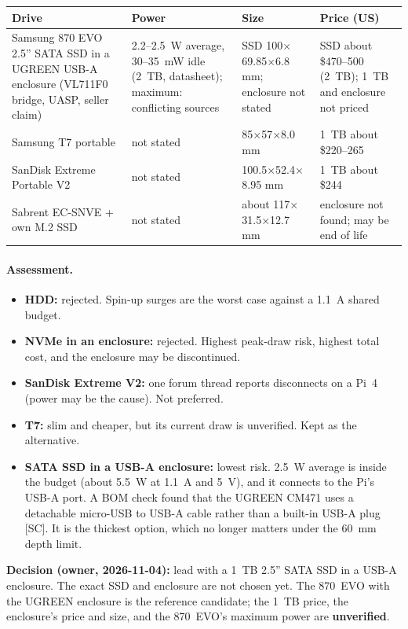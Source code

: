\documentclass[11pt,a4paper]{article}
\begin{document}
\begin{longtable}{p{4.2cm} p{3.4cm} p{3.6cm} p{3.2cm}}
\toprule
\textbf{Drive} & \textbf{Power} & \textbf{Size} & \textbf{Price (US)} \\
\midrule\endhead
Samsung 870 EVO 2.5'' SATA SSD in a UGREEN USB-A enclosure (VL711F0 bridge, UASP, seller claim) & 2.2--2.5~W average, 30--35~mW idle (2~TB, datasheet); maximum: conflicting sources & SSD 100$\times$69.85$\times$6.8 mm; enclosure not stated & SSD about \$470--500 (2~TB); 1~TB and enclosure not priced \\
Samsung T7 portable & not stated & 85$\times$57$\times$8.0 mm & 1~TB about \$220--265 \\
SanDisk Extreme Portable V2 & not stated & 100.5$\times$52.4$\times$8.95 mm & 1~TB about \$244 \\
Sabrent EC-SNVE + own M.2 SSD & not stated & about 117$\times$31.5$\times$12.7 mm & enclosure not found; may be end of life \\
\bottomrule
\end{longtable}

\paragraph{Assessment.}
\begin{itemize}
  \item \textbf{HDD:} rejected. Spin-up surges are the worst case against a 1.1~A shared budget.
  \item \textbf{NVMe in an enclosure:} rejected. Highest peak-draw risk, highest total cost, and the enclosure may be discontinued.
  \item \textbf{SanDisk Extreme V2:} one forum thread reports disconnects on a Pi~4 (power may be the cause). Not preferred.
  \item \textbf{T7:} slim and cheaper, but its current draw is unverified. Kept as the alternative.
  \item \textbf{SATA SSD in a USB-A enclosure:} lowest risk. 2.5~W average is inside the budget (about 5.5~W at 1.1~A and 5~V), and it connects to the Pi's USB-A port. A BOM check found that the UGREEN CM471 uses a detachable micro-USB to USB-A cable rather than a built-in USB-A plug [SC]. It is the thickest option, which no longer matters under the 60~mm depth limit.
\end{itemize}

\textbf{Decision (owner, 2026-11-04):} lead with a 1~TB 2.5'' SATA SSD in a USB-A enclosure. The exact SSD and enclosure are not chosen yet. The 870~EVO with the UGREEN enclosure is the reference candidate; the 1~TB price, the enclosure's price and size, and the 870~EVO's maximum power are \textbf{unverified}.
\end{document}
